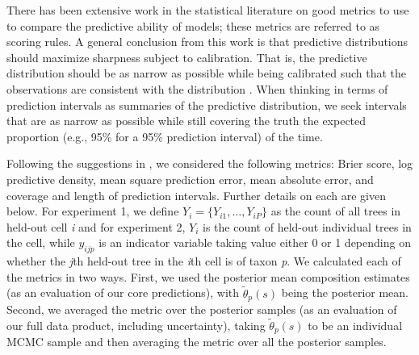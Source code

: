 \documentclass[10pt,letterpaper]{article}
\begin{document}
There has been extensive work in the statistical literature on good
metrics to use to compare the predictive ability of models; these
metrics are referred to as scoring rules. A general conclusion from
this work is that predictive distributions should maximize sharpness
subject to calibration. That is, the predictive distribution should
be as narrow as possible while being calibrated such that the observations
are consistent with the distribution \cite{Gnei:etal:2007}. When
thinking in terms of prediction intervals as summaries of the predictive
distribution, we seek intervals that are as narrow as possible while
still covering the truth the expected proportion (e.g., 95\% for a
95\% prediction interval) of the time. 

Following the suggestions in \cite{Gnei:etal:2007}, we considered
the following metrics: Brier score, log predictive density, mean square
prediction error, mean absolute error, and coverage and length of
prediction intervals. Further details on each are given below. For
experiment 1, we define $Y_{i}=\{Y_{i1},\ldots,Y_{iP}\}$ as the count
of all trees in held-out cell \emph{i} and for experiment 2, $Y_{i}$
is the count of held-out individual trees in the cell, while $y_{ijp}$
is an indicator variable taking value either 0 or 1 depending on whether
the \emph{j}th held-out tree in the \emph{i}th cell is of taxon \emph{p}. We calculated
each of the metrics in two ways. First, we used the posterior mean
composition estimates (as an evaluation of our core predictions),
with $\tilde{\theta}_{p}(s)$ being the posterior mean. Second, we
averaged the metric over the posterior samples (as an evaluation of
our full data product, including uncertainty), taking $\tilde{\theta}_{p}(s)$
to be an individual MCMC sample and then averaging the metric over
all the posterior samples. 
\end{document}
